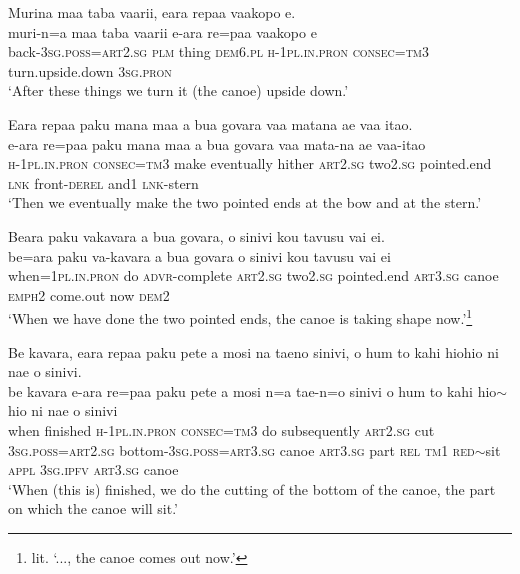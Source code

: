 \ea\label{ex:text16-15}
Murina maa taba vaarii, eara repaa vaakopo e.\\
\gll muri-n=a	maa	taba	vaarii	e-ara	re=paa	vaakopo	e\\
     back-3\textsc{sg}.\textsc{poss}=\textsc{art}2.\textsc{sg}	\textsc{plm}	thing	\textsc{dem}6.\textsc{pl}	\textsc{h}-1\textsc{pl}.\textsc{in}.\textsc{pron}	\textsc{consec}=\textsc{tm}3	turn.upside.down	3\textsc{sg}.\textsc{pron}\\
\glt `After these things we turn it (the canoe) upside down.'
\z

\ea\label{ex:text16-16}
Eara repaa paku mana maa a bua govara vaa matana ae vaa itao.\\
\gll e-ara	re=paa	paku	mana	maa	a	bua	govara	vaa	mata-na	ae	vaa-itao\\
     \textsc{h}-1\textsc{pl}.\textsc{in}.\textsc{pron}	\textsc{consec}=\textsc{tm}3	make	eventually	hither	\textsc{art}2.\textsc{sg}	two2.\textsc{sg}	pointed.end	\textsc{lnk}	front-\textsc{derel}	and1	\textsc{lnk}-stern\\
\glt `Then we eventually make the two pointed ends at the bow and at the stern.'
\z

\ea\label{ex:text16-17}
Beara paku vakavara a bua govara, o sinivi kou tavusu vai ei.\\
\gll be=ara	paku	va-kavara	a	bua	govara	o	sinivi	kou	tavusu	vai	ei\\
     when=1\textsc{pl}.\textsc{in}.\textsc{pron}	do	\textsc{advr}-complete	\textsc{art}2.\textsc{sg}	two2.\textsc{sg}	pointed.end	\textsc{art}3.\textsc{sg}	canoe	\textsc{emph}2	come.out	now	\textsc{dem}2\\
\glt `When we have done the two pointed ends, the canoe is taking shape now.'\footnote{lit. `..., the canoe comes out now.'}
\z

\ea\label{ex:text16-18}
Be kavara, eara repaa paku pete a mosi na taeno sinivi, o hum to kahi hiohio ni nae o sinivi.\\
\gll be	kavara	e-ara	re=paa	paku	pete	a	mosi	n=a	tae-n=o	sinivi	o	hum	to	kahi	hio{$\sim$}hio	ni	nae	o	sinivi\\
     when	finished	\textsc{h}-1\textsc{pl}.\textsc{in}.\textsc{pron}	\textsc{consec}=\textsc{tm}3	do	subsequently	\textsc{art}2.\textsc{sg}	cut	3\textsc{sg}.\textsc{poss}=\textsc{art}2.\textsc{sg}	bottom-3\textsc{sg}.\textsc{poss}=\textsc{art}3.\textsc{sg}	canoe	\textsc{art}3.\textsc{sg}	part	\textsc{rel}	\textsc{tm}1	\textsc{red}{$\sim$}sit	\textsc{appl}	3\textsc{sg}.\textsc{ipfv}	\textsc{art}3.\textsc{sg}	canoe\\
\glt `When (this is) finished, we do the cutting of the bottom of the canoe, the part on which the canoe will sit.'
\z

